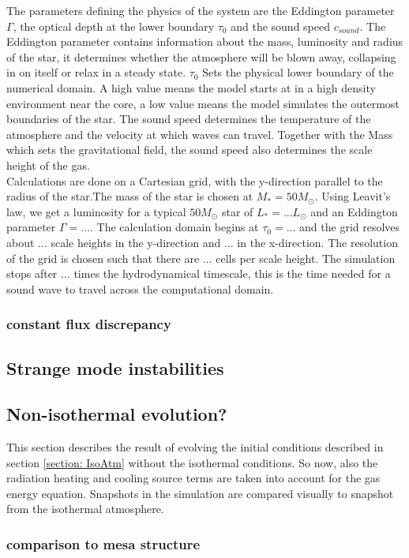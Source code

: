 The parameters defining the physics of the system are the Eddington parameter $\Gamma$, the optical depth at the lower boundary $\tau_0$ and the sound speed $c_{sound}$. The Eddington parameter contains information about the mass, luminosity and radius of the star, it determines whether the atmosphere will be blown away, collapsing in on itself or relax in a steady state. $\tau_0$ Sets the physical lower boundary of the numerical domain. A high value means the model starts at in a high density environment near the core, a low value means the model simulates the outermost boundaries of the star. The sound speed determines the temperature of the atmosphere and the velocity at which waves can travel. Together with the Mass which sets the gravitational field, the sound speed also determines the scale height of the gas. \\

Calculations are done on a Cartesian grid, with the y-direction parallel to the radius of the star.The mass of the star is chosen at $M_* = 50 M_\odot$. Using Leavit's law, we get a luminosity for a typical $50M_\odot$ star of $L_* = ... L_\odot$ and an Eddington parameter $\Gamma = ...$. The calculation domain begins at $\tau_0 = ...$ and the grid resolves about $...$ scale heights in the y-direction and $...$ in the x-direction. The resolution of the grid is chosen such that there are $...$ cells per scale height. The simulation stops after $...$ times the hydrodynamical timescale, this is the time needed for a sound wave to travel across the computational domain. 

\subsubsection{constant flux discrepancy}

\subsection{Strange mode instabilities}

\subsection{Non-isothermal evolution?}
This section describes the result of evolving the initial conditions described in section \ref{section: IsoAtm} without the isothermal conditions. So now, also the radiation heating and cooling source terms are taken into account for the gas energy equation. Snapshots in the simulation are compared visually to snapshot from the isothermal atmosphere.

\subsubsection{comparison to mesa structure}

